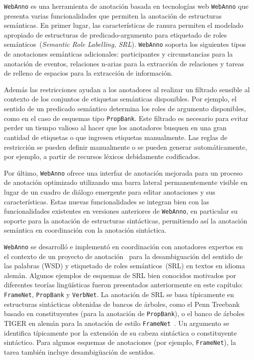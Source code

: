 \texttt{WebAnno} es una herramienta de anotación basada en tecnologías web \texttt{WebAnno} que presenta varias funcionalidades que permiten la anotación de estructuras semánticas.
En primer lugar, las características de ranura permiten el modelado apropiado de estructuras de predicado-argumento para etiquetado de roles semánticos~(\textit{Semantic Role Labelling, SRL}).
\texttt{WebAnno} soporta los siguientes tipos de anotaciones semánticas adicionales: participantes y circunstancias para la anotación de eventos, relaciones n-arias para la extracción de relaciones y tareas de relleno de espacios para la extracción de información.

Además las restricciones ayudan a los anotadores al realizar un filtrado sensible al contexto de los conjuntos de etiquetas semánticas disponibles.
Por ejemplo, el sentido de un predicado semántico determina los roles de argumento disponibles, como en el caso de esquemas tipo \texttt{PropBank}.
Este filtrado es necesario para evitar perder un tiempo valioso al hacer que los anotadores busquen en una gran cantidad de etiquetas o que ingresen etiquetas manualmente.
Las reglas de restricción se pueden definir manualmente o se pueden generar automáticamente, por ejemplo, a partir de recursos léxicos debidamente codificados.

Por último, \texttt{WebAnno} ofrece una interfaz de anotación mejorada para un proceso de anotación optimizado utilizando una barra lateral permanentemente visible en lugar de un cuadro de diálogo emergente para editar anotaciones y sus características.
Estas nuevas funcionalidades se integran bien con las funcionalidades existentes en versiones anteriores de \texttt{WebAnno}, en particular su soporte para la anotación de estructuras sintácticas, permitiendo así la anotación semántica en coordinación con la anotación sintáctica.

\texttt{WebAnno} se desarrolló e implementó en coordinación con anotadores expertos en el contexto de un proyecto de anotación~\cite{mujdricza2016combining} para la desambiguación del sentido de las palabras (WSD) y etiquetado de roles semánticos~(SRL) en textos en idioma alemán.
Algunos ejemplos de esquemas de SRL bien conocidos motivados por diferentes teorías lingüísticas fueron presentados anteriormente en este capítulo: \texttt{FrameNet}, \texttt{PropBank} y \texttt{VerbNet}.
La anotación de SRL se basa típicamente en estructuras sintácticas obtenidas de bancos de árboles, como el Penn Treebank basado en constituyentes (para la anotación de \texttt{PropBank}), o el banco de árboles TIGER en alemán para la anotación de estilo \texttt{FrameNet}~\cite{burchardt20098}.
Un argumento se identifica típicamente por la extensión de su cabeza sintáctica o constituyente sintáctico.
Para algunos esquemas de anotaciones (por ejemplo, \texttt{FrameNet}), la tarea también incluye desambigüación de sentidos.

